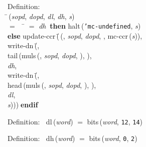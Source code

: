\begin{tabbing}{\sc Definition}: \\  
\=\,({\it{sopd\/}}, {\it{dopd\/}}, {\it{dl\/}}, {\it{dh\/}}, {\it{s\/}}) \\ 
$=$$\;\;\;\;$\= $=$ {\it{dh\/}}$\;\;${\bf then }{\rm{halt}}\,({\tt{'}}{\tt{mc-undefined}}, {\it{s\/}}) \\ 
{\bf else }{\rm{update-ccr}}\,(\=\,({}, {\it{sopd\/}}, {\it{dopd\/}}, {}, {\rm{mc-ccr}}\,({\it{s\/}})), \\ 
{\rm{write-dn}}\,(\=, \\ 
{\rm{tail}}\,({\rm{muls}}\,({}, {\it{sopd\/}}, {\it{dopd\/}}, {}), {}), \\ 
{\it{dh\/}}, \\ 
{\rm{write-dn}}\,(\=, \\ 
{\rm{head}}\,({\rm{muls}}\,({}, {\it{sopd\/}}, {\it{dopd\/}}, {}), {}), \\ 
{\it{dl\/}}, \\ 
{\it{s\/}})\-)\-)\-$\;${\bf  endif}\-\-
\end{tabbing}

\begin{tabbing}{\sc Definition}:$\;\;$
{\rm{dl}}\,({\it{word\/}}) $=$ {\rm{bits}}\,({\it{word\/}}, {\tt{12}}, {\tt{14}})
\end{tabbing}

\begin{tabbing}{\sc Definition}:$\;\;$
{\rm{dh}}\,({\it{word\/}}) $=$ {\rm{bits}}\,({\it{word\/}}, {\tt{0}}, {\tt{2}})
\end{tabbing}

